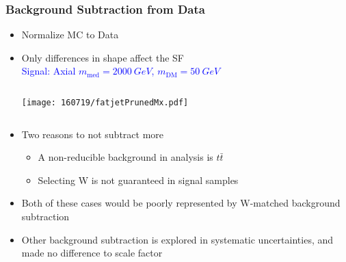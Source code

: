 \documentclass{beamer}
\begin{document}
\begin{frame}
  \frametitle{Background Subtraction from Data}
  \begin{itemize}
  \item Normalize MC to Data
  \item Only differences in shape affect the SF \vspace{-2pt} \\
    \textcolor{blue}{\scriptsize \hspace{-35pt} Signal: Axial
      $m_\text{med} = \SI{2000}{GeV}$,
      $m_\text{DM} = \SI{50}{GeV}$}
    \begin{columns}
      \begin{column}{0.4\linewidth}
        \centering
        \texttt{[image: 160719/fatjetPrunedMx.pdf]}
      \end{column}
    \end{columns}
  \item Two reasons to not subtract more
    \begin{itemize}
    \item A non-reducible background in analysis is $t\bar{t}$
    \item Selecting W is not guaranteed in signal samples
    \end{itemize}
  \item Both of these cases would be poorly represented by
    W-matched background subtraction
  \item Other background subtraction is explored in systematic uncertainties, 
    and made no difference to scale factor
  \end{itemize}
\end{frame}
\end{document}
